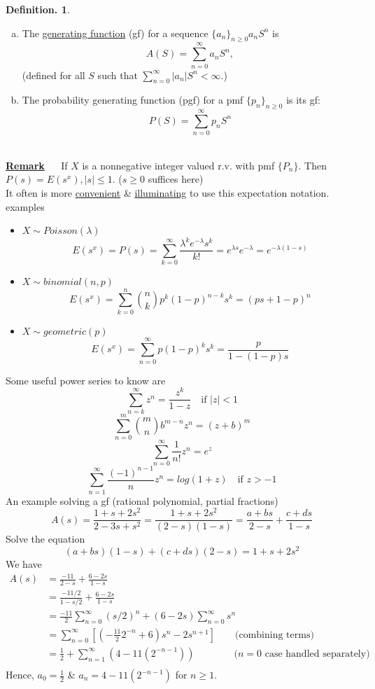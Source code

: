 \documentclass[12pt]{article}
\theoremstyle{definition}
\newtheorem{mydef}{Definition.}[section]
\theoremstyle{plain}
\begin{document}
\begin{mydef}
\begin{enumerate}[(a)]
\item The \underline{generating function} (gf) for a sequence $\{a_n\}_{n \geq 0} a_n S^n$ is \[A(S) = \sum_{n=0}^\infty a_n S^n,\] (defined for all $S$ such that $\sum_{n=0}^\infty |a_n|S^n < \infty$.)
\item The probability generating function (pgf) for a pmf $\{p_n\}_{n \geq 0}$ is its gf: \[P(S) = \sum_{n=0}^\infty p_n S^n\]
\end{enumerate}
\end{mydef}
$\mbox{}$\\
\underline{\textbf{Remark}} $\quad$ If $X$ is a nonnegative  integer valued r.v. with pmf $\{P_n\}$. Then $P(s) = E(s^x), |s| \leq 1$. ($s \geq 0$ suffices here)\\
It often is more \underline{convenient} \& \underline{illuminating} to use this expectation notation.\\ 
examples \begin{itemize}
\item $X \sim Poisson(\lambda)$ \[E(s^x) = P(s) = \sum_{k=0}^\infty \frac{\lambda^k e^{-\lambda}s^k}{k!}=e^{\lambda s}e^{-\lambda} = e^{-\lambda(1-s)}\]
\item $X \sim binomial(n,p)$ \[E(s^x) = \sum_{k=0}^n {n \choose k} p^k (1-p)^{n-k} s^k = (ps + 1 - p)^n\]
\item $X \sim geometric(p)$ \[E(s^x) = \sum_{n=0}^\infty p(1-p)^k s^k = \frac{p}{1 - (1-p)s}\]
\end{itemize}
Some useful power series to know are
 \[\sum_{n=k}^\infty z^n = \frac{z^k}{1-z}\quad \mbox{if $|z| < 1$}\]
 \[\sum_{n=0}^m {m \choose n} b^{m-n}z^n = (z+b)^m\]
 \[\sum_{n=0}^\infty \frac{1}{n!} z^n = e^z\]
 \[\sum_{n=1}^\infty \frac{(-1)^{n-1}}{n}z^n = log(1+z) \quad \mbox{if $z > -1$}\]
An example solving a gf (rational polynomial, partial fractions)
\[A(s) = \frac{1 + s + 2s^2}{2-3s+s^2} = \frac{1 + s + 2s^2}{(2-s)(1-s)} = \frac{a + bs}{2-s} + \frac{c+ds}{1-s}\]
Solve the equation \[(a+bs)(1-s) + (c+ds)(2-s) = 1 + s + 2s^2\]
We have
\begin{displaymath}
\begin{aligned}
A(s) &=  \frac{-11}{2-s} + \frac{6-2s}{1-s}\\
       &=  \frac{-11/2}{1 - s/2} + \frac{6-2s}{1-s} \\
	&= \frac{-11}{2} \sum_{n=0}^{\infty} (s/2)^n + (6-2s)\sum_{n=0}^\infty s^n \\
	&= \sum_{n=0}^\infty [(-\frac{11}{2} 2^{-n} + 6)s^n - 2s^{n+1}] \qquad \mbox{(combining terms)} \\
	&= \frac{1}{2} + \sum_{n=1}^\infty (4 - 11(2^{-n-1})) \qquad  \qquad \mbox{($n=0$ case handled separately)} \\
\end{aligned}
\end{displaymath}
Hence, $a_0 = \frac{1}{2}$ \& $a_n = 4 - 11(2^{-n-1})$ for $n \geq 1$.
\end{document}
